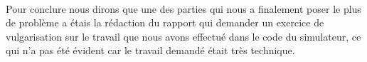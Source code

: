 \documentclass[12pt]{article}
\begin{document}
\paragraph{} Pour conclure nous dirons que une des parties qui nous a finalement poser le plus de problème a étais la rédaction du rapport qui demander un exercice de vulgarisation sur le travail que nous avons effectué dans le code du simulateur, ce qui n'a pas été évident car le travail demandé était très technique.
\end{document}
